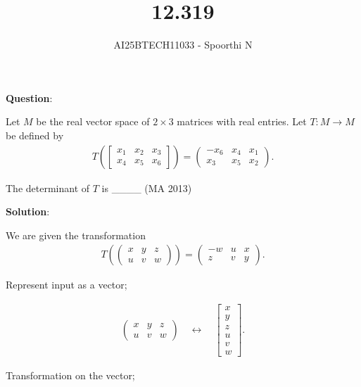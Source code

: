 \documentclass{beamer}
\title{12.319}
\author{AI25BTECH11033 - Spoorthi N}
\theoremstyle{remark}
\numberwithin{equation}{section}
\begin{document}
{\let\newpage\relax\maketitle}
\renewcommand{\thefigure}{\theenumi}
\renewcommand{\thetable}{\theenumi}

\textbf{Question}:

Let $M$ be the real vector space of $2 \times 3$ matrices with real entries.  
Let $T : M \to M$ be defined by
\begin{align}
T\!\left( 
\begin{bmatrix}
x_{1} & x_{2} & x_{3} \\
x_{4} & x_{5} & x_{6}
\end{bmatrix}
\right)
=
\begin{pmatrix}
-x_{6} & x_{4} & x_{1} \\
x_{3} & x_{5} & x_{2}
\end{pmatrix}.
\end{align}

The determinant of $T$ is \_\_\_\_ \hfill (MA 2013)

\textbf{Solution}:

We are given the transformation
\begin{align}
T\!\left(
\begin{pmatrix}
x & y & z \\
u & v & w
\end{pmatrix}
\right)
=
\begin{pmatrix}
-w & u & x \\
z & v & y
\end{pmatrix}.
\end{align}

Represent input as a vector;

\begin{align}
\begin{pmatrix}
x & y & z \\
u & v & w
\end{pmatrix}
\quad \longleftrightarrow \quad
\begin{bmatrix}
x \\ y \\ z \\ u \\ v \\ w
\end{bmatrix}.
\end{align}

Transformation on the vector;
\end{document}
